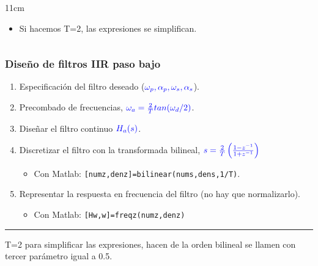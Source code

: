 \documentclass[handout]{beamer}
\numberwithin{section}{part}
\begin{document}
\begin{frame}
\begin{itemize}
\begin{columns}[T]
\begin{column}{11cm}
\begin{itemize}
        Se cumple que  $\omega_d \!\in \![0,\pi] \leftrightarrow \omega_a \!\in\! [0,\infty)$; $\omega_d  \!\in\! [0,-\pi] \leftrightarrow \omega_a \!\in\! [0,-\infty)$
        \color{black}
        \item \alert{Si hacemos T=2, las expresiones se simplifican.}
      \end{itemize}
      \end{column}
    \end{columns}

  \end{itemize}
\end{frame}


\begin{frame}
\frametitle{Diseño de filtros IIR paso bajo}
\small
\begin{enumerate}
  \item Especificación del filtro deseado ($\color{blue}\omega_p,\alpha_p,\omega_s,\alpha_s$).
  \item Precombado de frecuencias, $\color{blue}\omega_a=\frac{2}{T}tan(\omega_d/2)$.
  \item Diseñar el filtro continuo $\color{blue}H_a(s)$.
  \item Discretizar el filtro con la transformada bilineal, $\color{blue}s=\frac{2}{T}\left ( \frac{1-z^{-1}}{1+z^{-1}}\right)$ %
  \begin{itemize}
  \item Con Matlab: \alert{\texttt{[numz,denz]=bilinear(nums,dens,1/T)}}.
  \end{itemize}

\item Representar la respuesta en frecuencia del filtro (no hay que normalizarlo).
\begin{itemize}
\item Con Matlab: \alert{\texttt{[Hw,w]=freqz(numz,denz)}}


\end{itemize}

\end{enumerate}

\rule{12cm}{0.4pt}
\footnotesize

T=2 para simplificar las expresiones, hacen de la orden bilineal se llamen con tercer parámetro igual a 0.5.

\end{frame}
\end{document}

